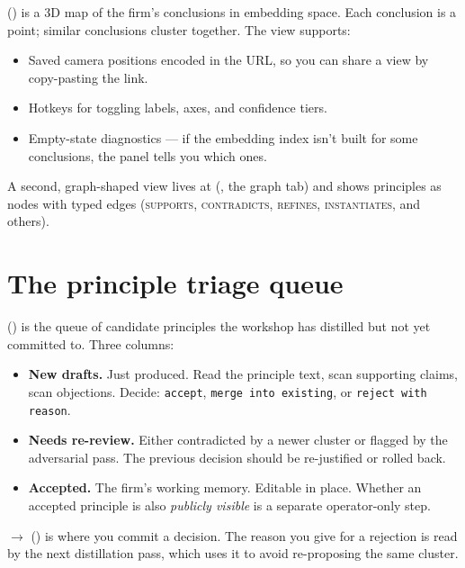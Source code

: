 \documentclass[11pt]{article}
\begin{document}
 () is a 3D map of the firm's
conclusions in embedding space. Each conclusion is a point; similar
conclusions cluster together. The view supports:

\begin{itemize}[leftmargin=*,itemsep=0.2em]
  \item Saved camera positions encoded in the URL, so you can share a
        view by copy-pasting the link.
  \item Hotkeys for toggling labels, axes, and confidence tiers.
  \item Empty-state diagnostics --- if the embedding index isn't built
        for some conclusions, the panel tells you which ones.
\end{itemize}


A second, graph-shaped view lives at 
(, the graph tab) and shows principles as nodes with
typed edges (\textsc{supports}, \textsc{contradicts}, \textsc{refines},
\textsc{instantiates}, and others).

\section{The principle triage queue}

 () is the queue of
candidate principles the workshop has distilled but not yet committed
to. Three columns:

\begin{itemize}[leftmargin=*,itemsep=0.2em]
  \item \textbf{New drafts.} Just produced. Read the principle text,
        scan supporting claims, scan objections. Decide: \texttt{accept},
        \texttt{merge into existing}, or \texttt{reject with reason}.
  \item \textbf{Needs re-review.} Either contradicted by a newer
        cluster or flagged by the adversarial pass. The previous
        decision should be re-justified or rolled back.
  \item \textbf{Accepted.} The firm's working memory. Editable in
        place. Whether an accepted principle is also \emph{publicly
        visible} is a separate operator-only step.
\end{itemize}

 $\to$ 
() is where you commit a decision. The
reason you give for a rejection is read by the next distillation pass,
which uses it to avoid re-proposing the same cluster.
\end{document}
